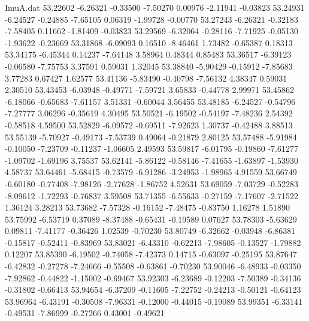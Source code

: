 \begin{filecontents}{ImuA.dat}
  53.22602   -6.26321   -0.33500   -7.50270    0.00976   -2.11941   -0.03823
  53.24931   -6.24527   -0.24885   -7.65105    0.06319   -1.99728   -0.00770
  53.27243   -6.26321   -0.32183   -7.58405    0.11662   -1.81409   -0.03823
  53.29569   -6.32064   -0.28116   -7.71925   -0.05130   -1.93622   -0.23669
  53.31868   -6.09093    0.16510   -8.46461    1.73482   -0.65387    0.18313
  53.34175   -6.45344    0.14237   -7.64148    3.58964    0.48344    0.85483
  53.36517   -6.39123   -0.06580   -7.75753    3.37591    0.59031    1.32045
  53.38840   -5.90429   -0.15912   -7.85683    3.77283    0.67427    1.62577
  53.41136   -5.83490   -0.40798   -7.56132    4.38347    0.59031    2.30510
  53.43453   -6.03948   -0.49771   -7.59721    3.65833   -0.44778    2.99971
  53.45862   -6.18066   -0.65683   -7.61157    3.51331   -0.60044    3.56455
  53.48185   -6.24527   -0.54796   -7.27777    3.06296   -0.35619    4.30495
  53.50521   -6.19502   -0.54197   -7.48236    2.54392   -0.58518    4.59500
  53.52829   -6.09572   -0.69511   -7.92623    1.30737   -0.42488    3.88513
  53.55139   -5.70927   -0.49173   -7.53739    0.49064   -0.21879    2.80125
  53.57488   -5.91984   -0.10050   -7.23709   -0.11237   -1.06605    2.49593
  53.59817   -6.01795   -0.19860   -7.61277   -1.09702   -1.69196    3.75537
  53.62141   -5.86122   -0.58146   -7.41655   -1.63897   -1.53930    4.58737
  53.64461   -5.68415   -0.73579   -6.91286   -3.24953   -1.98965    4.91559
  53.66749   -6.60180   -0.77408   -7.98126   -2.77628   -1.86752    4.52631
  53.69059   -7.03729   -0.52283   -8.09612   -1.72293   -0.76837    3.59508
  53.71355   -6.55633   -0.27159   -7.17607   -2.71522    1.36124    3.28213
  53.73682   -7.57328   -0.16152   -7.48475   -0.83750    1.16278    1.51890
  53.75992   -6.53719    0.37089   -8.37488   -0.65431   -0.19589    0.07627
  53.78303   -5.63629    0.09811   -7.41177   -0.36426    1.02539   -0.70230
  53.80749   -6.32662   -0.03948   -6.86381   -0.15817   -0.52411   -0.83969
  53.83021   -6.43310   -0.62213   -7.98605   -0.13527   -1.79882    0.12207
  53.85390   -6.19502   -0.74058   -7.42373    0.14715   -0.63097   -0.25195
  53.87647   -6.42832   -0.27278   -7.24666   -0.55508   -0.63861   -0.70230
  53.90046   -6.48933   -0.03350   -7.92862   -0.44822   -1.15002   -0.69467
  53.92303   -6.23689   -0.12203   -7.50389   -0.34136   -0.31802   -0.66413
  53.94654   -6.37209   -0.11605   -7.22752   -0.24213   -0.50121   -0.64123
  53.96964   -6.43191   -0.30508   -7.96331   -0.12000   -0.44015   -0.19089
  53.99351   -6.33141   -0.49531   -7.86999   -0.27266    0.43001   -0.49621

\end{filecontents}
